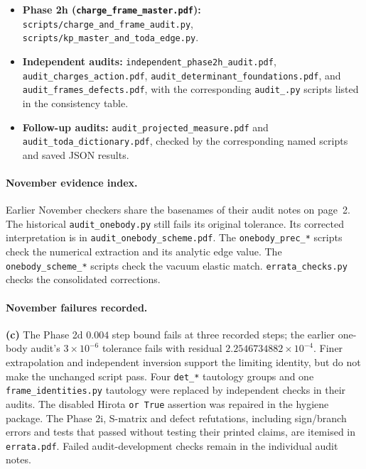 \documentclass[11pt,a4paper]{article}
\newcommand{\Lc}{\textsf{\textbf{(c)}}\xspace}
\newcommand{\script}[1]{\texttt{scripts/#1}}
\newcommand{\file}[1]{\nolinkurl{#1}}
\theoremstyle{remark}\newtheorem{remark}[proposition]{Remark}
\begin{document}
\begin{itemize}
\item \textbf{Phase 2h (\texttt{charge\_\allowbreak frame\_\allowbreak master.pdf}):} \script{charge\_\allowbreak and\_\allowbreak frame\_\allowbreak audit.py}, \script{kp\_\allowbreak master\_\allowbreak and\_\allowbreak toda\_\allowbreak edge.py}.
\item \textbf{Independent audits:} \texttt{independent\_\allowbreak phase2h\_\allowbreak audit.pdf},
\texttt{audit\_\allowbreak charges\_\allowbreak action.pdf}, \texttt{audit\_\allowbreak determinant\_\allowbreak foundations.pdf},
and \texttt{audit\_\allowbreak frames\_\allowbreak defects.pdf}, with the corresponding
\texttt{audit\_\allowbreak *.py} scripts listed in the consistency table.
\item \textbf{Follow-up audits:} \texttt{audit\_\allowbreak projected\_\allowbreak measure.pdf}
and \texttt{audit\_\allowbreak toda\_\allowbreak dictionary.pdf}, checked by the
corresponding named scripts and saved JSON results.
\end{itemize}
\endgroup

\paragraph{November evidence index.}
Earlier November checkers share the basenames of their audit notes on
page~2. The historical \file{audit_onebody.py} still fails its original
tolerance. Its corrected interpretation is in \file{audit_onebody_scheme.pdf}.
The \file{onebody_prec_*} scripts check the numerical extraction and its
analytic edge value. The \file{onebody_scheme_*} scripts check the vacuum
elastic match. \file{errata_checks.py} checks the consolidated corrections.

\paragraph{November failures recorded.}
\Lc The Phase 2d $0.004$ step bound fails at three recorded steps; the earlier
one-body audit's $3\times10^{-6}$ tolerance fails with residual
$2.2546734882\times10^{-4}$. Finer extrapolation and independent inversion
support the limiting identity, but do not make the unchanged script pass.
Four \file{det_*} tautology groups and one \file{frame_identities.py} tautology
were replaced by independent checks in their audits. The disabled Hirota
\file{or True} assertion was repaired in the hygiene package.
The Phase 2i, S-matrix and defect refutations, including sign/branch errors
and tests that passed without testing their printed claims, are itemised
in \file{errata.pdf}. Failed audit-development checks remain in the individual
audit notes.
\end{document}

